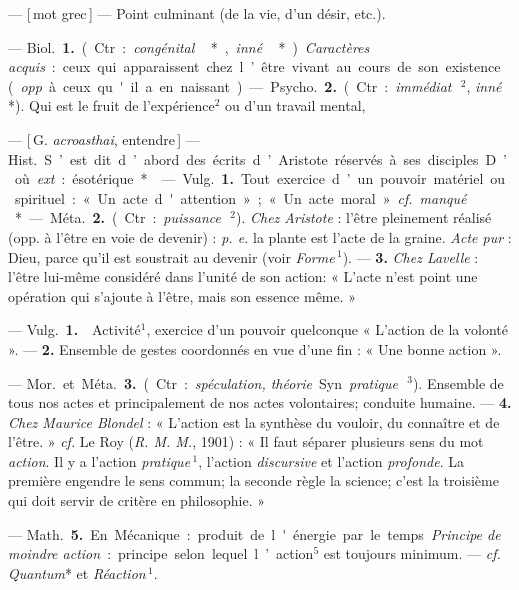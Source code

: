 \begin{itemize}[leftmargin=1cm, label=, itemsep=1pt]
 — [\,mot grec\,] — Point culminant
(de la vie, d’un désir, etc.).

 — \si{Biol.} {\bf 1.} (Ctr. : {\it congénital}\,*,
{\it inné}\,*). {\it Caractères acquis} : ceux qui
apparaissent chez l’être vivant au
cours de son existence ({\it opp}. à ceux
qu'il a en naissant).

— \si{Psycho.} {\bf 2.} (Ctr. : {\it immédiat}\,$^2$,
{\it inné}\,*). Qui est le fruit de l’expérience$^2$ ou d’un travail mental,

 — [\,G. {\it acroasthai}, entendre\,] — \si{Hist.} S’est dit d’abord des
écrits d’Aristote réservés à ses disciples. D’où {\it ext}. : ésotérique*.

 — \si{Vulg.} {\bf 1.} Tout exercice d’un
pouvoir matériel ou spirituel : « Un
acte d'attention »; « Un acte moral ».
{\it cf.}  {\it manqué}\,*.

— \si{Méta.} {\bf 2.} (Ctr.: {\it puissance}\,$^2$). {\it Chez
Aristote} : l'être pleinement réalisé
(opp. à l'être en voie de devenir) :
{\it p. e.} la plante est l'acte de la graine.
{\it Acte pur} : Dieu, parce qu’il est soustrait au devenir
(voir {\it Forme}\,$^1$). —
 {\bf 3.} {\it Chez Lavelle} : l'être lui-même
considéré dans l’unité de son action:
« L'acte n’est point une opération
qui s'ajoute à l'être, mais son
essence même. »

 — \si{Vulg.} {\bf 1.}  Activité$^1$, exercice d’un pouvoir quelconque
« L'action de la volonté ». — {\bf 2.} 
Ensemble de gestes coordonnés
en vue d'une fin : « Une bonne
action ».

— \si{Mor.} et \si{Méta.} {\bf 3.} (Ctr. : {\it spéculation, théorie}. Syn. {\it pratique}\,$^3$).
Ensemble de tous nos actes et principalement de nos actes volontaires;
conduite humaine. — {\bf 4.} {\it Chez Maurice Blondel} : « L'action est la
synthèse du vouloir, du connaître et de
l'être. » {\it cf.}  Le Roy ({\it R. M. M.}, 1901) :
« Il faut séparer plusieurs sens du
mot {\it action}. Il y a l’action {\it pratique}\,$^1$,
l’action {\it discursive} et l'action {\it profonde}. La première engendre le sens
commun; la seconde règle la science;
c’est la troisième qui doit servir de
critère en philosophie. »

— \si{Math.} {\bf 5.} En Mécanique : produit de l'énergie par le temps.
{\it Principe de moindre action} : principe
selon lequel l’action$^5$ est toujours
minimum. — {\it cf.}  {\it Quantum}* et
{\it Réaction}\,$^1$.


\end{itemize}
